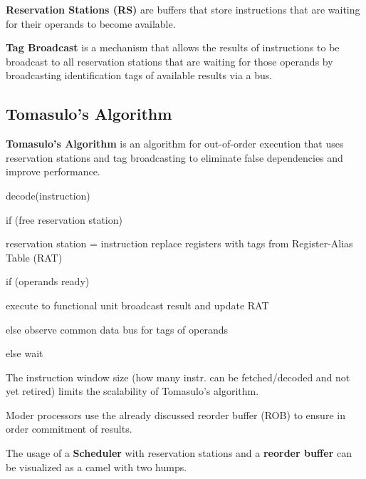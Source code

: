 \begin{definition}
    \textbf{Reservation Stations (RS)} are buffers that store instructions that are waiting for their operands to become available.
\end{definition}

\begin{definition}
    \textbf{Tag Broadcast} is a mechanism that allows the results of instructions to be broadcast to all reservation stations that are waiting for those operands by broadcasting identification tags of available results via a bus.
\end{definition}

\subsection{Tomasulo's Algorithm}

\begin{definition}
    \textbf{Tomasulo's Algorithm} is an algorithm for out-of-order execution that uses reservation stations and tag broadcasting to eliminate false dependencies and improve performance.
\end{definition}

\begin{algorithm}
decode(instruction)

if (free reservation station) {

    reservation station = instruction
    replace registers with tags from Register-Alias Table (RAT)

    if (operands ready) {

        execute to functional unit
        broadcast result and update RAT

    } else {
        observe common data bus for tags of operands
    }

} else {
    wait
}
\end{algorithm}

\begin{important}
    The instruction window size (how many instr. can be fetched/decoded and not yet retired) limits the scalability of Tomasulo's algorithm.
\end{important}

\begin{remark}
    Moder processors use the already discussed reorder buffer (ROB) to ensure in order commitment of results.
\end{remark}

\begin{remark}
    The usage of a \textbf{Scheduler} with reservation stations and a \textbf{reorder buffer} can be visualized as a camel with two humps.
\end{remark}

